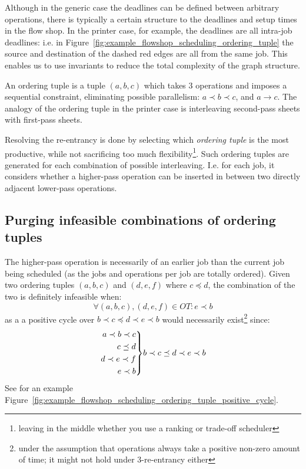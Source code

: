 \documentclass[]{article}
\newenvironment{rcases}
{\left.\begin{aligned}}
    {\end{aligned}\right\rbrace}
\begin{document}
Although in the generic case the deadlines can be defined between arbitrary operations, there is typically a certain structure to the deadlines and setup times in the flow shop. In the printer case, for example, the deadlines are all intra-job deadlines: i.e. in Figure~\ref{fig:example_flowshop_scheduling_ordering_tuple} the source and destination of the dashed red edges are all from the same job. This enables us to use invariants to reduce the total complexity of the graph structure.

An ordering tuple is a tuple $(a,b,c)$ which takes 3 operations and imposes a sequential constraint, eliminating possible parallelism: $a \prec b \prec c$, and $a\to c$. The analogy of the ordering tuple in the printer case is interleaving second-pass sheets with first-pass sheets. 

Resolving the re-entrancy is done by selecting which \textit{ordering tuple} is the most productive, while not sacrificing too much flexibility\footnote{leaving in the middle whether you use a ranking or trade-off scheduler}. Such ordering tuples are generated for each combination of possible interleaving. I.e. for each job, it considers whether a higher-pass operation can be inserted in between two directly adjacent lower-pass operations. 

\subsection{Purging infeasible combinations of ordering tuples}
The higher-pass operation is necessarily of an earlier job than the current job being scheduled (as the jobs and operations per job are totally ordered). Given two ordering tuples $(a,b,c)$ and $(d,e,f)$ where $c\preceq d$, the combination of the two is definitely infeasible when:
\begin{equation}
\forall (a,b,c), (d,e,f) \in OT : e \prec b
\end{equation}
as a a positive cycle over $b \prec c \preceq d \prec e \prec b$ would necessarily exist\footnote{under the assumption that operations always take a positive non-zero amount of time; it might not hold under 3-re-entrancy either} since:
\begin{equation}
\begin{rcases}
    a \prec b \prec c\\
    c \preceq d\\
    d \prec e \prec f\\
    e \prec b
\end{rcases} b \prec c \preceq d \prec e \prec b
\end{equation}
See for an example Figure~\ref{fig:example_flowshop_scheduling_ordering_tuple_positive_cycle}.
\end{document}
